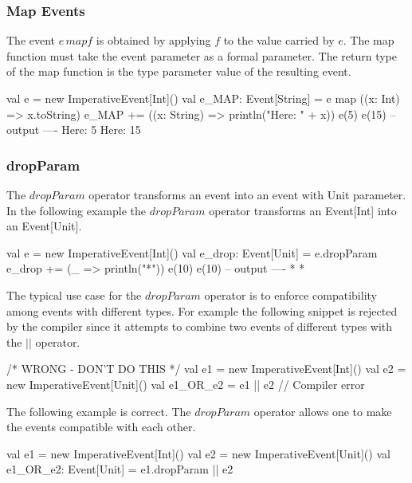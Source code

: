 \documentclass[10pt,a4paper]{article}
\newcommand{\code}[1]{{\fontfamily{cmtt}\small\selectfont#1}}
\begin{document}
\subsubsection{Map Events}

The event $e\,map f$ is obtained by applying $f$ to the value carried
by $e$. The map function must take the event parameter as a formal
parameter. The return type of the map function is the type parameter
value of the resulting event.

\begin{codenv}
val e = new ImperativeEvent[Int]()
val e_MAP: Event[String] = e map ((x: Int) => x.toString) 
e_MAP += ((x: String) => println("Here: " + x))
e(5)
e(15)
-- output ----
Here: 5
Here: 15
\end{codenv}




\subsubsection{dropParam}

The $dropParam$ operator transforms an event into an event with
\code{Unit} parameter. In the following example the $dropParam$
operator transforms an \code{Event[Int]} into an \code{Event[Unit]}.

\begin{codenv}
val e = new ImperativeEvent[Int]()
val e_drop: Event[Unit] = e.dropParam  
e_drop += (_ => println("*"))
e(10)
e(10)
-- output ----
*
*
\end{codenv}

The typical use case for the $dropParam$ operator is to enforce
compatibility among events with different types. For example the
following snippet is rejected by the compiler since it attempts to
combine two events of different types with the $||$ operator.

\begin{codenv}     /* WRONG - DON'T DO THIS */
val e1 = new ImperativeEvent[Int]()
val e2 = new ImperativeEvent[Unit]()
val e1_OR_e2 = e1 || e2  // Compiler error
\end{codenv}

The following example is correct. The $dropParam$ operator allows
one to make the events compatible with each other.

\begin{codenv}
val e1 = new ImperativeEvent[Int]()
val e2 = new ImperativeEvent[Unit]()
val e1_OR_e2: Event[Unit] = e1.dropParam || e2
\end{codenv}
\end{document}

